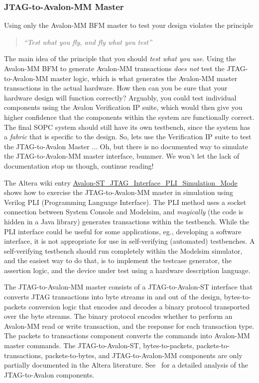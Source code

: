 \documentclass[10pt,twoside]{article}
\begin{document}
\subsubsection{JTAG-to-Avalon-MM Master}

Using only the Avalon-MM BFM master to test your design violates 
the principle
%
\begin{quote}
{\em ``Test what you fly, and fly what you test''}
\end{quote}
%
The main idea of the principle that you should {\em test what you 
use}. Using the Avalon-MM BFM to generate Avalon-MM transactions
{\em does not} test the JTAG-to-Avalon-MM master logic,
which is what generates the Avalon-MM master transactions in the
actual hardware. How then can you be sure that your hardware design
will function correctly? Arguably, you could test individual
components using the Avalon Verification IP suite, which would
then give you higher confidence that the components within the
system are functionally correct. The final SOPC system should still
have its own testbench, since the system has a {\em fabric} that is
specific to the design. So, lets use the Verification IP suite to test
the JTAG-to-Avalon Master $\dots$ Oh, but there is no documented way to
simulate the JTAG-to-Avalon-MM master interface, bummer.
We won't let the lack of documentation stop us though, continue 
reading!

The Altera wiki entry
\href{http://www.alterawiki.com/wiki/Avalon-ST_JTAG_Interface_PLI_Simulation_Mode}
{Avalon-ST\_JTAG\_Interface\_PLI\_Simulation\_Mode} shows
how to exercise the JTAG-to-Avalon-MM master in simulation using Verilog PLI
(Programming Language Interface). The PLI method uses a socket connection
between System Console and Modelsim, and {\em magically} (the code
is hidden in a Java library) generates transactions within the testbench.
While the PLI interface could be useful for some applications,
eg., developing a software interface, it is not appropriate for
use in self-verifying (automated) testbenches.
%
A self-verifying testbench should run completely within the Modelsim 
simulator, and the easiest way to do that, is to implement the testcase 
generator, the assertion logic, and the device under test using a
hardware description language.

The JTAG-to-Avalon-MM master consists of a JTAG-to-Avalon-ST interface
that converts JTAG transactions into byte streams in and out of the 
design, bytes-to-packets conversion logic that encodes and decodes
a binary protocol transported over the byte streams.
The binary protocol encodes whether to perform an Avalon-MM read or 
write transaction, and the response for each transaction type.
The packets to transactions component converts the commands
into Avalon-MM master commands.
The JTAG-to-Avalon-ST, bytes-to-packets, packets-to-transactions,
packets-to-bytes, and JTAG-to-Avalon-MM components are only
partially documented in the Altera literature. 
See~\cite{Hawkins_Altera_JTAG_to_Avalon_Analysis_2012} for
a detailed analysis of the JTAG-to-Avalon components.
\end{document}
